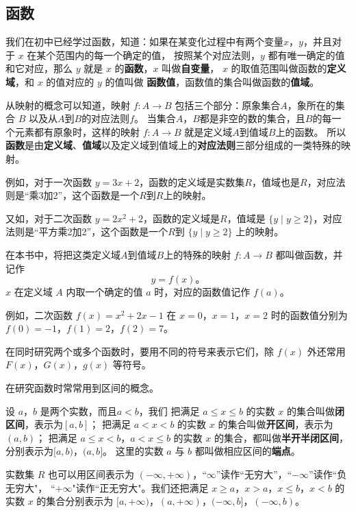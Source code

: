 \subsection{函数}

我们在初中已经学过函数，知道：如果在某变化过程中有两个变量$x$，$y$，并且对于 $x$ 在某个范围内的每一个确定的值，
按照某个对应法则，$y$ 都有唯一确定的值和它对应，那么 $y$ 就是 $x$ 的\textbf{函数}，$x$ 叫做\textbf{自变量}，
$x$ 的取值范围叫做函数的\textbf{定义域}，和 $x$ 的值对应的 $y$ 的值叫做 \textbf{函数值}，函数值的集合叫做函数的\textbf{值域}。

从映射的概念可以知道，映射 $f: A \to B$ 包括三个部分：原象集合$A$，象所在的集合 $B$ 以及从$A$到$B$的对应法则$f$。
当集合$A$，$B$都是非空的数的集合，且$B$的每一个元素都有原象时，这样的映射 $f: A \to B$ 就是定义域$A$到值域$B$上的函数。
所以\textbf{函数}是由\textbf{定义域}、\textbf{值域}以及定义域到值域上的\textbf{对应法则}三部分组成的一类特殊的映射。

例如，对于一次函数 $y=3x+2$，函数的定义域是实数集$R$，值域也是$R$，对应法则是“乘3加2”，这个函数是一个$R$到$R$上的映射。

又如，对于二次函数 $y=2x^2+2$，函数的定义域是$R$，值域是 $\{y \mid y \geqslant 2\}$，对应法则是“平方乘2加2”，这个函数是一个$R$到 $\{y \mid y \geqslant 2\}$ 上的映射。

在本书中，将把这类定义域$A$到值域$B$上的特殊的映射 $f : A \to B$ 都叫做函数，并记作
$$y = f(x) \text{。}$$
$x$ 在定义域 $A$ 内取一个确定的值 $a$ 时，对应的函数值记作 $f(a)$。

例如，二次函数 $f(x)=x^2+2x-1$ 在 $x=0$，$x=1$，$x=2$ 时的函数值分别为 $f(0)=-1$，$f(1)=2$，$f(2)=7$。

在同时研究两个或多个函数时，要用不同的符号来表示它们，除 $f(x)$ 外还常用 $F(x)$，$G(x)$，$g(x)$ 等符号。

在研究函数时常常用到区间的概念。

设 $a$，$b$ 是两个实数，而且$a<b$，我们
把满足 $a \leqslant x \leqslant b$ 的实数 $x$ 的集合叫做\textbf{闭区间}，表示为$[a,b]$；
把满足 $a < x < b$ 的实数 $x$ 的集合叫做\textbf{开区间}，表示为 $(a, b)$；
把满足 $a \leqslant x < b$，$a < x \leqslant b$ 的实数 $x$ 的集合，都叫做\textbf{半开半闭区间}，分别表示为$[a,b)$，$(a,b]$。
这里的实数 $a$ 与 $b$ 都叫做相应区间的\textbf{端点}。

实数集 $R$ 也可以用区间表示为 $(-\infty, +\infty)$，“$\infty$”读作“无穷大”，“$-\infty$”读作“负无穷大"，
“$+\infty$"读作“正无穷大"。我们还把满足 $x \geqslant a$，$x > a$，$x \leqslant b$，$x < b$ 的实数 $x$
的集合分别表示为 $[a, +\infty)$，$(a, +\infty)$，$(-\infty, b]$，$(-\infty, b)$。

